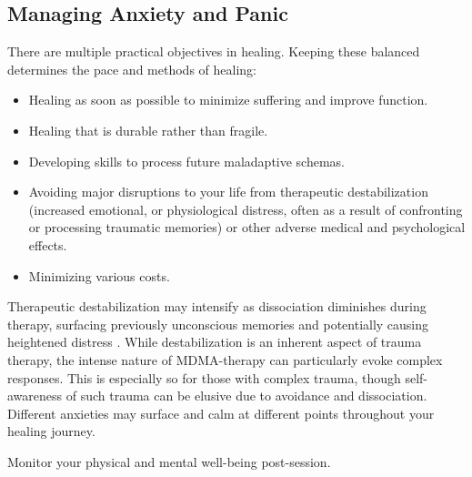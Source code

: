 \documentclass[12pt,letterpaper]{book}
\begin{document}
\subsection{Managing Anxiety and Panic}
\label{sectionManagement}
There are multiple practical objectives in healing. Keeping these balanced determines the pace and methods of healing: 
\begin{itemize}
    \item Healing as soon as possible to minimize suffering and improve function.
    \item Healing that is durable rather than fragile.
    \item Developing skills to process future maladaptive schemas.
    \item Avoiding major disruptions to your life from therapeutic destabilization (increased emotional, or physiological distress, often as a result of confronting or processing traumatic memories) or other adverse medical and psychological effects.
    \item Minimizing various costs.
\end{itemize}
Therapeutic destabilization may intensify as dissociation diminishes during therapy, surfacing previously unconscious memories and potentially causing heightened distress \cite{vanderKolkBody}. While destabilization is an inherent aspect of trauma therapy, the intense nature of MDMA-therapy can particularly evoke complex responses. This is especially so for those with complex trauma, though self-awareness of such trauma can be elusive due to avoidance and dissociation. Different anxieties may surface and calm at different points throughout your healing journey.

Monitor your physical and mental well-being post-session. 


\vspace{\baselineskip}
\end{document}

